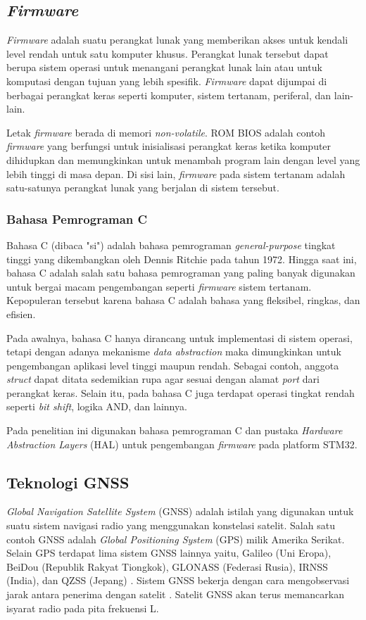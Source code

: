 \subsection{\textit{Firmware}}
\textit{Firmware} adalah suatu perangkat lunak yang memberikan akses untuk kendali level rendah untuk satu komputer khusus. Perangkat lunak tersebut dapat berupa sistem operasi untuk menangani perangkat lunak lain atau untuk komputasi dengan tujuan yang lebih spesifik. \textit{Firmware} dapat dijumpai di berbagai perangkat keras seperti komputer, sistem tertanam, periferal, dan lain-lain.

Letak \textit{firmware} berada di memori \textit{non-volatile}. ROM BIOS adalah contoh \textit{firmware} yang berfungsi untuk inisialisasi perangkat keras ketika komputer dihidupkan dan memungkinkan untuk menambah program lain dengan level yang lebih tinggi di masa depan. Di sisi lain, \textit{firmware} pada sistem tertanam adalah satu-satunya perangkat lunak yang berjalan di sistem tersebut.

\subsubsection{Bahasa Pemrograman C}
Bahasa C (dibaca "si") adalah bahasa pemrograman \textit{general-purpose} tingkat tinggi yang dikembangkan oleh Dennis Ritchie pada tahun 1972. Hingga saat ini, bahasa C adalah salah satu bahasa pemrograman yang paling banyak digunakan untuk bergai macam pengembangan seperti \textit{firmware} sistem tertanam. Kepopuleran tersebut karena bahasa C adalah bahasa yang fleksibel, ringkas, dan efisien.

Pada awalnya, bahasa C hanya dirancang untuk implementasi di sistem operasi, tetapi dengan adanya mekanisme \textit{data abstraction} maka dimungkinkan untuk pengembangan aplikasi level tinggi maupun rendah. Sebagai contoh, anggota \textit{struct} dapat ditata sedemikian rupa agar sesuai dengan alamat \textit{port} dari perangkat keras. Selain itu, pada bahasa C juga terdapat operasi tingkat rendah seperti \textit{bit shift}, logika AND, dan lainnya.

Pada penelitian ini digunakan bahasa pemrograman C dan pustaka \textit{Hardware Abstraction Layers} (HAL) untuk pengembangan \textit{firmware} pada platform STM32.

\subsection{Teknologi GNSS}
\textit{Global Navigation Satellite System} (GNSS) adalah istilah yang digunakan untuk suatu sistem navigasi radio yang menggunakan konstelasi satelit. Salah satu contoh GNSS adalah \textit{Global Positioning System} (GPS) milik Amerika Serikat. Selain GPS terdapat lima sistem GNSS lainnya yaitu, Galileo (Uni Eropa), BeiDou (Republik Rakyat Tiongkok), GLONASS (Federasi Rusia), IRNSS (India), dan QZSS (Jepang) \cite{NationalCoordinationOfficeforSpace-BasedPositioning2021}. Sistem GNSS bekerja dengan cara mengobservasi jarak antara penerima dengan satelit \cite{TheEuropeanGlobalNavigationSatelliteSystemsAgency2021}. Satelit GNSS akan terus memancarkan isyarat radio pada pita frekuensi L.

